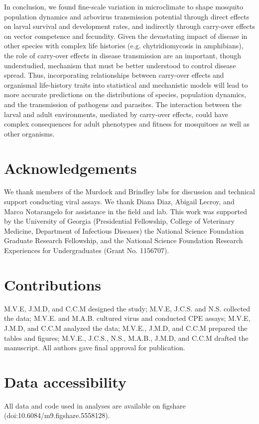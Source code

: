 \documentclass[12pt]{article}
\begin{document}
In conclusion, we found fine-scale variation in microclimate to shape mosquito population dynamics and arbovirus transmission potential through direct effects on larval survival and development rates, and indirectly through carry-over effects on vector competence and fecundity. Given the devastating impact of disease in other species with complex life histories (e.g. chytridiomycosis in amphibians), the role of carry-over effects in disease transmission are an important, though understudied, mechanism that must be better understood to control disease spread. Thus, incorporating relationships between carry-over effects and organismal life-history traits into statistical and mechanistic models will lead to more accurate predictions on the distributions of species, population dynamics, and the transmission of pathogens and parasites. The interaction between the larval and adult environments, mediated by carry-over effects, could have complex consequences for adult phenotypes and fitness for mosquitoes as well as other organisms.

\section{Acknowledgements}
We thank members of the Murdock and Brindley labs for discussion and technical support conducting viral assays. We thank Diana Diaz, Abigail Lecroy, and Marco Notarangelo for assistance in the field and lab. This work was supported by the University of Georgia (Presidential Fellowship, College of Veterinary Medicine, Department of Infectious Diseases) the National Science Foundation Graduate Research Fellowship, and the National Science Foundation Research Experiences for Undergraduates (Grant No. 1156707).

\section{Contributions}
M.V.E, J.M.D, and C.C.M designed the study; M.V.E, J.C.S. and N.S. collected the data; M.V.E. and M.A.B. cultured virus and conducted CPE assays; M.V.E, J.M.D, and C.C.M analyzed the data; M.V.E., J.M.D, and C.C.M prepared the tables and figures; M.V.E., J.C.S., N.S., M.A.B., J.M.D, and C.C.M drafted the manuscript. All authors gave final approval for publication.

\section{Data accessibility}
All data and code used in analyses are available on figshare (doi:10.6084/m9.figshare.5558128).
\end{document}
